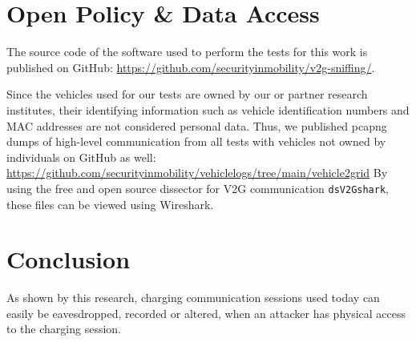 \documentclass[sigconf]{acmart}
\begin{document}

\section{Open Policy \& Data Access}
The source code of the software used to perform the tests for this work is published on GitHub: \url{https://github.com/securityinmobility/v2g-sniffing/}.

Since the vehicles used for our tests are owned by our or partner research institutes, their identifying information such as vehicle identification numbers and MAC addresses are not considered personal data.
Thus, we published pcapng dumps of high-level communication from all tests with vehicles not owned by individuals on GitHub as well: \url{https://github.com/securityinmobility/vehiclelogs/tree/main/vehicle2grid}
By using the free and open source dissector for V2G communication \texttt{dsV2Gshark}\cite{dspace_dsv2gshark_nodate}, these files can be viewed using Wireshark\cite{wireshark_wireshark_nodate}.

\section{Conclusion}
As shown by this research, charging communication sessions used today can easily be eavesdropped, recorded or altered, when an attacker has physical access to the charging session.
\end{document}
